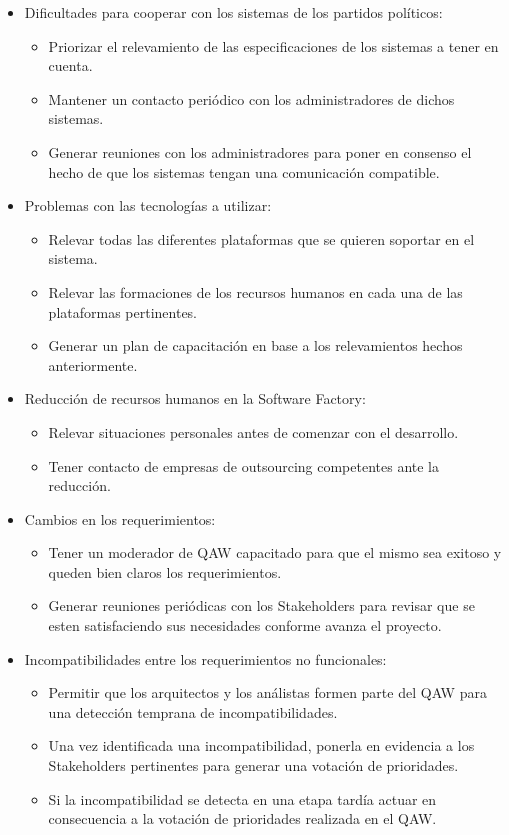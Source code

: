 \begin{itemize}
\item Dificultades para cooperar con los sistemas de los partidos pol\'iticos:
\begin{itemize}
\item Priorizar el relevamiento de las especificaciones de los sistemas a tener en cuenta.
\item Mantener un contacto peri\'odico con los administradores de dichos sistemas.
\item Generar reuniones con los administradores para poner en consenso el hecho de que los sistemas tengan una comunicaci\'on compatible.
\end{itemize}

\item Problemas con las tecnolog\'ias a utilizar:
\begin{itemize}
\item Relevar todas las diferentes plataformas que se quieren soportar en el sistema.
\item Relevar las formaciones de los recursos humanos en cada una de las plataformas pertinentes.
\item Generar un plan de capacitaci\'on en base a los relevamientos hechos anteriormente.
\end{itemize}

\item Reducci\'on de recursos humanos en la Software Factory:
\begin{itemize}
\item Relevar situaciones personales antes de comenzar con el desarrollo.
\item Tener contacto de empresas de outsourcing competentes ante la reducci\'on.
\end{itemize}

\item Cambios en los requerimientos:
\begin{itemize}
\item Tener un moderador de QAW capacitado para que el mismo sea exitoso y queden bien claros los requerimientos.
\item Generar reuniones peri\'odicas con los Stakeholders para revisar que se esten satisfaciendo sus necesidades conforme avanza el proyecto.
\end{itemize}

\item Incompatibilidades entre los requerimientos no funcionales:
\begin{itemize}
\item Permitir que los arquitectos y los an\'alistas formen parte del QAW para una detecci\'on temprana de incompatibilidades.
\item Una vez identificada una incompatibilidad, ponerla en evidencia a los Stakeholders pertinentes para generar una votaci\'on de prioridades.
\item Si la incompatibilidad se detecta en una etapa tard\'ia actuar en consecuencia a la votaci\'on de prioridades realizada en el QAW.
\end{itemize}


\end{itemize}
